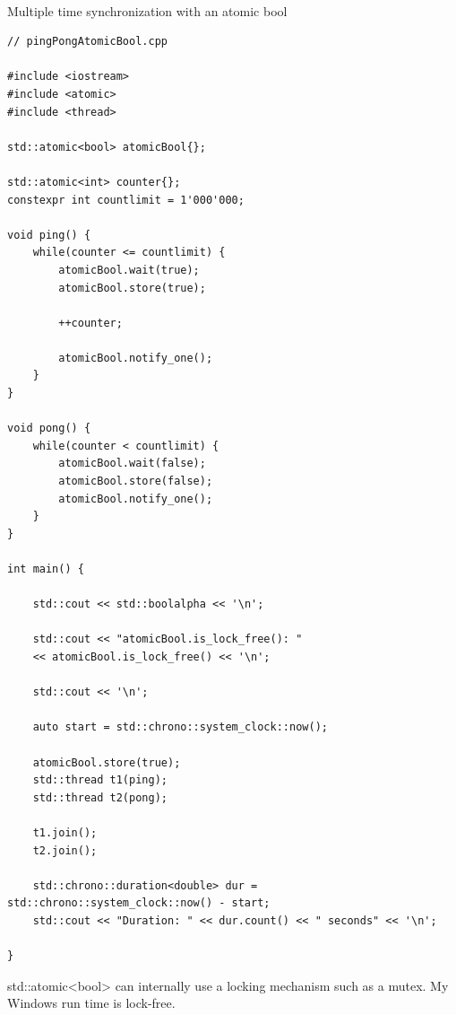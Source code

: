 \hspace*{\fill} \\ %
\noindent
Multiple time synchronization with an atomic bool
\begin{lstlisting}[style=styleCXX]
// pingPongAtomicBool.cpp

#include <iostream>
#include <atomic>
#include <thread>

std::atomic<bool> atomicBool{};

std::atomic<int> counter{};
constexpr int countlimit = 1'000'000;

void ping() {
	while(counter <= countlimit) {
		atomicBool.wait(true);
		atomicBool.store(true);
		
		++counter;
		
		atomicBool.notify_one();
	}
}

void pong() {
	while(counter < countlimit) {
		atomicBool.wait(false);
		atomicBool.store(false);
		atomicBool.notify_one();
	}
}

int main() {

	std::cout << std::boolalpha << '\n';
	
	std::cout << "atomicBool.is_lock_free(): "
	<< atomicBool.is_lock_free() << '\n';
	
	std::cout << '\n';
	
	auto start = std::chrono::system_clock::now();
	
	atomicBool.store(true);
	std::thread t1(ping);
	std::thread t2(pong);
	
	t1.join();
	t2.join();
	
	std::chrono::duration<double> dur = std::chrono::system_clock::now() - start;
	std::cout << "Duration: " << dur.count() << " seconds" << '\n';

}
\end{lstlisting}

std::atomic<bool> can internally use a locking mechanism such as a mutex. My Windows run time is lock-free.

